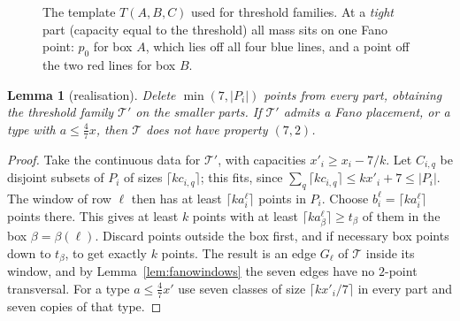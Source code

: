 \documentclass[11pt]{amsart}
\newtheorem{lemma}[theorem]{Lemma}
\theoremstyle{definition}
\theoremstyle{remark}
\begin{document}
\begin{figure}[t]
\centering
{}
\caption{The template $T(A,B,C)$ used for threshold families. At a \emph{tight} part (capacity equal to the threshold) all mass sits on one Fano point: $p_0$ for box $A$, which lies off all four blue lines, and a point off the two red lines for box $B$.}\label{fig:template}
\end{figure}

\begin{lemma}[realisation]\label{lem:realise}
Delete $\min(7,|P_i|)$ points from every part, obtaining the threshold family $\mathcal T'$ on the smaller parts. If $\mathcal T'$ admits a Fano placement, or a type with $a\le\tfrac47x$, then $\mathcal T$ does not have property $(7,2)$.
\end{lemma}

\begin{proof}
Take the continuous data for $\mathcal T'$, with capacities $x'_i\ge x_i-7/k$. Let $C_{i,q}$ be disjoint subsets of $P_i$ of sizes $\lceil kc_{i,q}\rceil$; this fits, since $\sum_q\lceil kc_{i,q}\rceil\le kx'_i+7\le|P_i|$. The window of row $\ell$ then has at least $\lceil ka^\ell_i\rceil$ points in $P_i$. Choose $b^\ell_i=\lceil ka^\ell_i\rceil$ points there. This gives at least $k$ points with at least $\lceil ka^\ell_{\beta}\rceil\ge t_\beta$ of them in the box $\beta=\beta(\ell)$. Discard points outside the box first, and if necessary box points down to $t_\beta$, to get exactly $k$ points. The result is an edge $G_\ell$ of $\mathcal T$ inside its window, and by Lemma~\ref{lem:fanowindows} the seven edges have no $2$-point transversal. For a type $a\le\frac47x'$ use seven classes of size $\lceil kx'_i/7\rceil$ in every part and seven copies of that type.
\end{proof}
\end{document}
